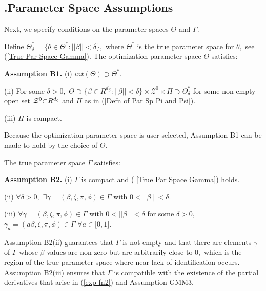 \documentclass[12pt,thmsb,titlepage,final,oneside,letterpaper]{article}
\begin{document}
\subsection{\hspace{-0.23in}\textbf{.}\hspace{0.18in}Parameter Space
Assumptions\label{Par Space Subsec}}

\hspace{0.25in}Next, we specify conditions on the parameter spaces $\Theta $
and $\Gamma .$

Define $\Theta _{\delta }^{\ast }=\{\theta \in \Theta ^{\ast }:||\beta
||<\delta \},$ where $\Theta ^{\ast }$ is the true parameter space for $%
\theta ,$ see (\ref{True Par Space Gamma}). The optimization parameter space 
$\Theta $ satisfies:\medskip

\noindent \textbf{Assumption B1.} (i) $int(\Theta )\supset \Theta ^{\ast }.$

\noindent (ii) For some $\delta >0,$ $\Theta \supset \{\beta \in R^{d_{\beta
}}:||\beta ||<\delta \}\times \mathcal{Z}^{0}\times \Pi \supset \Theta
_{\delta }^{\ast }$ for some non-empty open set $\mathcal{Z}^{0}\mathcal{%
\subset }R^{d_{\zeta }}$ and $\Pi $ as in (\ref{Defn of Par Sp Pi and Psi}).

\noindent (iii) $\Pi $ is compact.\medskip

\noindent Because the optimization parameter space is user selected,
Assumption B1 can be made to hold by the choice of $\Theta .$

The true parameter space $\Gamma $ satisfies:\medskip

\noindent \textbf{Assumption B2.} \noindent (i) $\Gamma $ is compact and (%
\ref{True Par Space Gamma}) holds.

\noindent (ii) $\forall \delta >0,$ $\exists \gamma =(\beta ,\zeta ,\pi
,\phi )\in \Gamma $ with $0<||\beta ||\,<\delta .$

\noindent (iii) $\forall \gamma =(\beta ,\zeta ,\pi ,\phi )\in \Gamma $ with 
$0<||\beta ||\,<\delta $ for some $\delta >0,$ $\gamma _{a}=(a\beta ,\zeta
,\pi ,\phi )\in \Gamma $ $\forall a\in \lbrack 0,1].$\medskip

\noindent Assumption B2(ii) guarantees that $\Gamma $ is not empty and that
there are elements $\gamma $ of $\Gamma $ whose $\beta $ values are non-zero
but are arbitrarily close to $0,$ which is the region of the true parameter
space where near lack of identification occurs. Assumption B2(iii) ensures
that $\Gamma $ is compatible with the existence of the partial derivatives
that arise in (\ref{exp fn2}) and Assumption GMM3.\medskip
\end{document}
